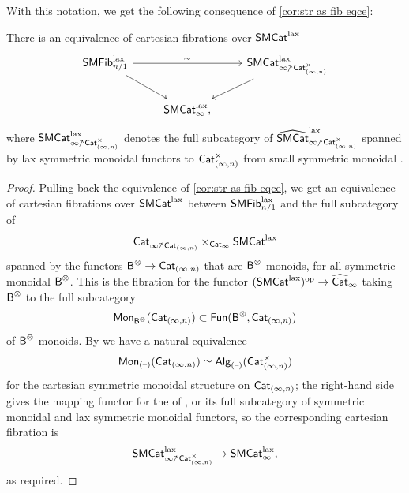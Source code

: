 \documentclass[a4paper,11pt]{article}
\begin{document}
With this notation, we get the following consequence of \cref{cor:str as fib eqce}:
\begin{cor}\label{cor:fibeqsmn}
  There is an equivalence of cartesian fibrations over $\textup{\textsf{SMCat}}^{\text{\textup{lax}}}$
  \[
    \begin{tikzcd}
     \SMFibl_{n/1} \ar[rr, "\sim"] \ar[dr] & & \SMCatIllsl{\CatIn^{\times}} \ar[dl] \\
      & \SMCatIl,
    \end{tikzcd}
  \]
  where $\SMCatIllsl{\CatIn^{\times}}$ denotes the full subcategory of
  $\LSMCatIllsl{\CatIn^{\times}}$ spanned by lax symmetric monoidal
  functors to $\textup{\textsf{Cat}}_{(\infty,n)}^{\times}$ from small symmetric monoidal \icats{}.
\end{cor}
\begin{proof}
  Pulling back the equivalence of \cref{cor:str as fib eqce}, we get
  an equivalence of cartesian fibrations over $\textup{\textsf{SMCat}}^{\text{\textup{lax}}}$ between
  $\textup{\textsf{SMFib}}^{\text{\textup{lax}}}_{n/1}$ and the full subcategory of
  \[ \CatIlsl{\CatIn} \times_{\CatI} \SMCatl\]
  spanned by the functors $\oB^{\otimes} \to \CatIn$ that are
  $\textup{\textsf{B}}^{\otimes}$-monoids, for all symmetric monoidal \icats{}
  $\textup{\textsf{B}}^{\otimes}$. This is the fibration for the functor
  $(\SMCatl)^{\op} \to \LCatI$ taking $\textup{\textsf{B}}^{\otimes}$ to the full subcategory
  \[\textup{\textsf{Mon}}_{\textup{\textsf{B}}^{\otimes}}(\textup{\textsf{Cat}}_{(\infty,n)}) \subset \textup{\textsf{Fun}}(\textup{\textsf{B}}^{\otimes}, \textup{\textsf{Cat}}_{(\infty,n)})\]
  of $\textup{\textsf{B}}^{\otimes}$-monoids. By \cite[Proposition 2.4.2.5]{HA} we
  have a natural equivalence
  \[ \textup{\textsf{Mon}}_{(\text{\textendash})}(\textup{\textsf{Cat}}_{(\infty,n)}) \simeq \textup{\textsf{Alg}}_{(\text{\textendash})}(\textup{\textsf{Cat}}_{(\infty,n)}^{\times})\]
  for the cartesian symmetric monoidal structure on $\textup{\textsf{Cat}}_{(\infty,n)}$; the
  right-hand side gives the mapping \icat{} functor for the \itcat{}
  of \iopds{}, or its full subcategory of symmetric monoidal \icats{}
  and lax symmetric monoidal functors, so the corresponding cartesian fibration is
  \[ \SMCatIllsl{\CatIn^{\times}} \to \SMCatIl,\]
  as required.
\end{proof}
\end{document}

